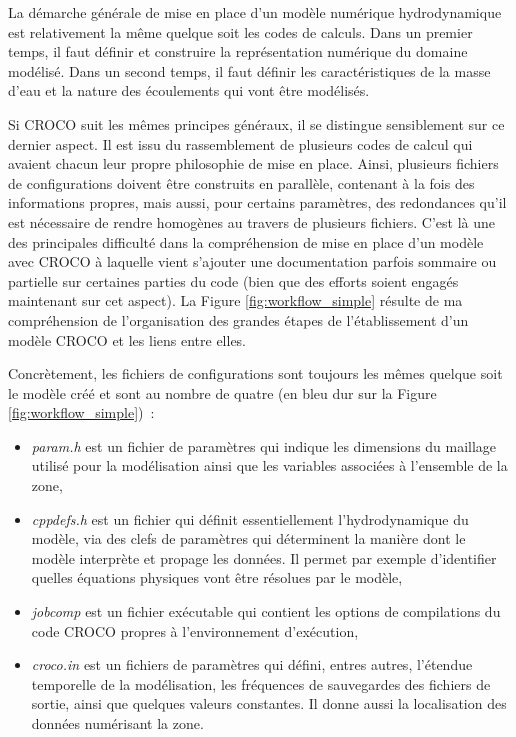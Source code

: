 \documentclass[10pt,a4paper,titlepage]{article}
\begin{document}
La démarche générale de mise en place d'un modèle numérique hydrodynamique est relativement la même quelque soit les codes de calculs. Dans un premier temps, il faut définir et construire la représentation numérique du domaine modélisé. Dans un second temps, il faut définir les caractéristiques de la masse d'eau et la nature des écoulements qui vont être modélisés.

Si CROCO suit les mêmes principes généraux, il se distingue sensiblement sur ce dernier aspect. Il est issu du rassemblement de plusieurs codes de calcul qui avaient chacun leur propre philosophie de mise en place.  Ainsi, plusieurs fichiers de configurations doivent être construits en parallèle, contenant à la fois des informations propres, mais aussi, pour certains paramètres, des redondances qu'il est nécessaire de rendre homogènes au travers de plusieurs fichiers. C'est là une des principales difficulté dans la compréhension de mise en place d'un modèle avec CROCO à laquelle vient s'ajouter une documentation parfois sommaire ou partielle sur certaines parties du code (bien que des efforts soient engagés maintenant sur cet aspect). La Figure \ref{fig:workflow_simple} résulte de ma compréhension de l'organisation des grandes étapes de l'établissement d'un modèle CROCO et les liens entre elles.

Concrètement, les fichiers de configurations sont toujours les mêmes quelque soit le modèle créé et sont au nombre de quatre (en bleu dur sur la Figure \ref{fig:workflow_simple})~:
\begin{itemize}
    \item \textit{param.h} est un fichier de paramètres qui indique les dimensions du maillage utilisé pour la modélisation ainsi que les variables associées à l'ensemble de la zone,
    \item \textit{cppdefs.h} est un fichier qui définit essentiellement l'hydrodynamique du modèle, via des clefs de paramètres qui déterminent la manière dont le modèle interprète et propage les données. Il permet par exemple d'identifier quelles équations physiques vont être résolues par le modèle,
    \item \textit{jobcomp} est un fichier exécutable qui contient les options de compilations du code CROCO propres à l'environnement d’exécution,
    \item \textit{croco.in} est un fichiers de paramètres qui défini, entres autres, l'étendue temporelle de la modélisation, les fréquences de sauvegardes des fichiers de sortie, ainsi que quelques valeurs constantes. Il donne aussi la localisation des données numérisant la zone.
\end{itemize}
\end{document}
